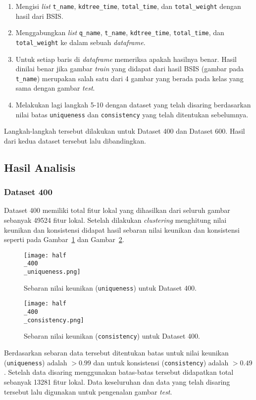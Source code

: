\begin{enumerate}
	\item Mengisi \textit{list} \texttt{t\_name}, \texttt{kdtree\_time}, \texttt{total\_time}, dan \texttt{total\_weight} dengan hasil dari BSIS.
	\item Menggabungkan \textit{list} \texttt{q\_name}, \texttt{t\_name}, \texttt{kdtree\_time}, \texttt{total\_time}, dan \texttt{total\_weight} ke dalam sebuah \textit{dataframe}.
	\item Untuk setiap baris di \textit{dataframe} memeriksa apakah hasilnya benar. Hasil dinilai benar jika gambar \textit{train} yang didapat dari hasil BSIS (gambar pada \texttt{t\_name}) merupakan salah satu dari 4 gambar yang berada pada kelas yang sama dengan gambar \textit{test}.
	\item Melakukan lagi langkah 5-10 dengan dataset yang telah disaring berdasarkan nilai batas \texttt{uniqueness} dan \texttt{consistency} yang telah ditentukan sebelumnya.
\end{enumerate}
Langkah-langkah tersebut dilakukan untuk Dataset 400 dan Dataset 600. Hasil dari kedua dataset tersebut lalu dibandingkan.

\subsection{Hasil Analisis}
\subsubsection{Dataset 400}
Dataset 400 memiliki total fitur lokal yang dihasilkan dari seluruh gambar sebanyak 49524 fitur lokal. Setelah dilakukan \textit{clustering} menghitung nilai keunikan dan konsistensi didapat hasil sebaran nilai keunikan dan konsistensi seperti pada Gambar~\ref{fig:half_400_uniqueness} dan Gambar~\ref{fig:half_400_consistency}.
\begin{figure}[H]
	\centering
	\texttt{[image: half\\\_400\\\_uniqueness.png]}
	\caption{Sebaran nilai keunikan (\texttt{uniqueness}) untuk Dataset 400.}
	\label{fig:half_400_uniqueness}
\end{figure}
\begin{figure}[H]
	\centering
	\texttt{[image: half\\\_400\\\_consistency.png]}
	\caption{Sebaran nilai keunikan (\texttt{consistency}) untuk Dataset 400.}
	\label{fig:half_400_consistency}
\end{figure}
Berdasarkan sebaran data tersebut ditentukan batas untuk nilai keunikan (\texttt{uniqueness}) adalah $> 0.99$ dan untuk konsistensi (\texttt{consistency}) adalah $> 0.49$. Setelah data disaring menggunakan batas-batas tersebut didapatkan total sebanyak 13281 fitur lokal. Data keseluruhan dan data yang telah disaring tersebut lalu digunakan untuk pengenalan gambar \textit{test}. 

